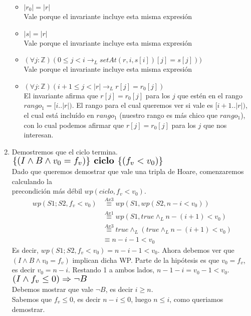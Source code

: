 \documentclass{article}
\begin{document}
\begin{enumerate}[label=\alph*)]
\begin{itemize}
	\item $|r_0|=|r|$\\
	Vale porque el invariante incluye esta misma expresión
	\item $|s|=|r|$\\
	Vale porque el invariante incluye esta misma expresión
	\item $(\forall j:\mathbb{Z})(0\leq j<i \rightarrow_L setAt(r,i,s[i])[j]=s[j]))$\\
	Vale porque el invariante incluye esta misma expresión
	\item $(\forall j:\mathbb{Z})(i+1\leq j<|r|\rightarrow_L r[j]=r_0[j])$\\
	El invariante afirma que $r[j]=r_0[j]$ para los $j$ que estén en el rango $rango_1=[i..|r|)$. El rango para el cual queremos 
	ver si vale es $[i+1..|r|)$, el cual está incluído en $rango_1$ (nuestro rango es más chico que $rango_1$), con lo cual podemos
	afirmar que $r[j]=r_0[j]$ para los $j $ que nos interesan.
	\end{itemize}
	\item Demostremos que el ciclo termina.\\
	$\scalebox{1.3}{$\{(I\wedge B\wedge v_0=f_v)\}\textbf{ ciclo }\{(f_v<v_0)\}$}$\medskip \\
	Dado que queremos demostrar que vale una tripla de Hoare, comenzaremos calculando la\\ precondición más débil $wp(ciclo,f_v<v_0)$.
	\begin{align*}
		wp(S1;S2,f_v<v_0)&\stackrel{Ax3}{\equiv}wp(S1,wp(S2,n-i<v_0))\\
			&\stackrel{Ax1}{\equiv}wp(S1,true\wedge_L n-(i+1)<v_0)\\
			&\stackrel{Ax3}{\equiv}true\wedge_L(true\wedge_L  n-(i+1)<v_0)\\
			&\equiv n-i-1<v_0
	\end{align*}
	Es decir, $wp(S1;S2,f_v<v_0)=n-i-1<v_0$. Ahora debemos ver que $(I\wedge B\wedge v_0=f_v)$ implican dicha WP. Parte de la 
	hipótesis es que $v_0=f_v$, es decir $v_0=n-i$. Restando 1 a ambos lados, $n-1-i=v_0-1<v_0$.\medskip \\
	$\scalebox{1.3}{$(I\wedge f_v\leq 0)\Rightarrow \neg B$}$\medskip\\
	Debemos mostrar que vale $\neg B$, es decir $i\geq n$.\\
	Sabemos que $f_v\leq 0$, es decir $n-i\leq 0$, luego $n\leq i$, como queriamos demostrar.
	
\end{enumerate}
\end{document}
